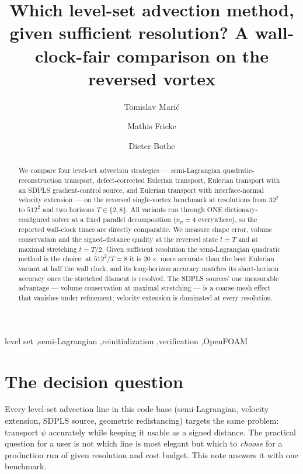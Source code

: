 \documentclass[preprint,3p,11pt]{elsarticle}
\newcommand{\psilev}{\psi}
\begin{document}
\begin{frontmatter}

\title{Which level-set advection method, given sufficient resolution?
A wall-clock-fair comparison on the reversed vortex}

\author[tuda]{Tomislav Mari\'{c}}
\author[tuda]{Mathis Fricke}
\author[tuda]{Dieter Bothe}
\address[tuda]{Mathematical Modeling and Analysis, TU Darmstadt, Germany}

\begin{abstract}
We compare four level-set advection strategies --- semi-Lagrangian
quadratic-reconstruction transport, defect-corrected Eulerian transport,
Eulerian transport with an SDPLS gradient-control source, and Eulerian
transport with interface-normal velocity extension --- on the reversed
single-vortex benchmark at resolutions from $32^2$ to $512^2$ and two
horizons $T \in \{2, 8\}$. All variants run through ONE dictionary-configured
solver at a fixed parallel decomposition ($n_p = 4$ everywhere), so the
reported wall-clock times are directly comparable. We measure shape error,
volume conservation and the signed-distance quality at the reversed state
$t = T$ and at maximal stretching $t = T/2$. Given sufficient resolution the
semi-Lagrangian quadratic method is the choice: at $512^2/T{=}8$ it is
$20\times$ more accurate than the best Eulerian variant at half the wall
clock, and its long-horizon accuracy matches its short-horizon accuracy once
the stretched filament is resolved. The SDPLS sources' one measurable
advantage --- volume conservation at maximal stretching --- is a coarse-mesh
effect that vanishes under refinement; velocity extension is dominated at
every resolution.
\end{abstract}

\begin{keyword}
level set \sep semi-Lagrangian \sep reinitialization \sep verification
\sep OpenFOAM
\end{keyword}
\end{frontmatter}

\section{The decision question}
Every level-set advection line in this code base (semi-Lagrangian,
velocity extension, SDPLS source, geometric redistancing) targets the same
problem: transport $\psilev$ accurately while keeping it usable as a signed
distance. The practical question for a user is not which line is most
elegant but which to \emph{choose} for a production run of given resolution
and cost budget. This note answers it with one benchmark.
\end{document}
